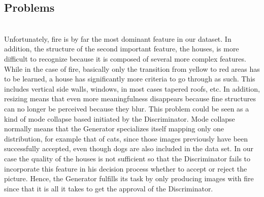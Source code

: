 \subsection{Problems}
\\
Unfortunately, fire is by far the most dominant feature in our dataset. In addition, the structure of the second important feature, the houses, is more difficult to recognize because it is composed of several more complex features. While in the case of fire, basically only the transition from yellow to red areas has to be learned, a house has significantly more criteria to go through as such. This includes vertical side walls, windows, in most cases tapered roofs, etc. In addition, resizing means that even more meaningfulness disappears because fine structures can no longer be perceived because they blur. This problem could be seen as a kind of mode collapse based initiated by the Discriminator. Mode collapse normally means that the Generator specializes itself mapping only one distribution, for example that of cats, since those images previously have been successfully accepted, even though dogs are also included in the data set. In our case the quality of the houses is not sufficient so that the Discriminator fails to incorporate this feature in his decision process whether to accept or reject the picture. Hence, the Generator fulfills its task by only producing images with fire since that it is all it takes to get the approval of the Discriminator. \\

